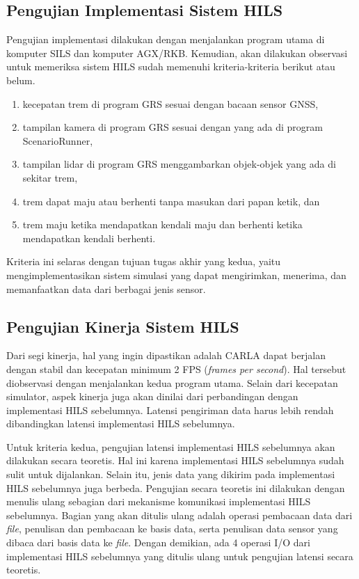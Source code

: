\subsection{Pengujian Implementasi Sistem HILS}

Pengujian implementasi dilakukan dengan menjalankan program utama di komputer
SILS dan komputer AGX/RKB. Kemudian, akan dilakukan observasi untuk memeriksa
sistem HILS sudah memenuhi kriteria-kriteria berikut atau belum.

\begin{enumerate}
	\item kecepatan trem di program GRS sesuai dengan bacaan sensor GNSS,
	\item tampilan kamera di program GRS sesuai dengan yang ada di program
	      ScenarioRunner,
	\item tampilan lidar di program GRS menggambarkan objek-objek yang ada di
	      sekitar trem,
	\item trem dapat maju atau berhenti tanpa masukan dari papan ketik, dan
	\item trem maju ketika mendapatkan kendali maju dan berhenti ketika
	      mendapatkan kendali berhenti.
\end{enumerate}

Kriteria ini selaras dengan tujuan tugas akhir yang kedua, yaitu
mengimplementasikan sistem simulasi yang dapat mengirimkan, menerima, dan
memanfaatkan data dari berbagai jenis sensor.

\subsection{Pengujian Kinerja Sistem HILS}

Dari segi kinerja, hal yang ingin dipastikan adalah CARLA dapat berjalan dengan
stabil dan kecepatan minimum 2 FPS (\textit{frames per second}). Hal tersebut
diobservasi dengan menjalankan kedua program utama. Selain dari kecepatan
simulator, aspek kinerja juga akan dinilai dari perbandingan dengan implementasi
HILS sebelumnya. Latensi pengiriman data harus lebih rendah dibandingkan latensi
implementasi HILS sebelumnya.

Untuk kriteria kedua, pengujian latensi implementasi HILS sebelumnya akan
dilakukan secara teoretis. Hal ini karena implementasi HILS sebelumnya sudah
sulit untuk dijalankan. Selain itu, jenis data yang dikirim pada implementasi
HILS sebelumnya juga berbeda. Pengujian secara teoretis ini dilakukan dengan
menulis ulang sebagian dari mekanisme komunikasi implementasi HILS sebelumnya.
Bagian yang akan ditulis ulang adalah operasi pembacaan data dari \textit{file},
penulisan dan pembacaan ke basis data, serta penulisan data sensor yang dibaca
dari basis data ke \textit{file}. Dengan demikian, ada 4 operasi I/O dari
implementasi HILS sebelumnya yang ditulis ulang untuk pengujian latensi secara
teoretis.

